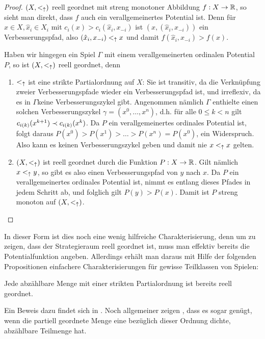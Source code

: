 \begin{proof}
	$(X, <_\uparrow)$ reell geordnet mit streng monotoner Abbildung $f: X \to \mathbb{R}$, so sieht man direkt, dass $f$ auch ein verallgemeinertes Potential ist. Denn für $x \in X, \hat{x}_i \in X_i$ mit $c_i(x) > c_i(\hat{x}_i, x_{-i})$ ist $(x, (\hat{x}_i, x_{-i}))$ ein Verbesserungspfad, also $(\hat{x}_i, x_{-i}) <_\uparrow x$ und damit $f(\hat{x}_i, x_{-i}) > f(x)$.
	
	Haben wir hingegen ein Spiel $\Gamma$ mit einem verallgemeinerten ordinalen Potential $P$, so ist $(X, <_\uparrow)$ reell geordnet, denn
	\begin{enumerate}
		\item $<_\uparrow$ ist eine strikte Partialordnung auf $X$: Sie ist transitiv, da die Verknüpfung zweier Verbesserungspfade wieder ein Verbesserungspfad ist, und irreflexiv, da es in $\Gamma$keine Verbesserungszykel gibt. Angenommen nämlich $\Gamma$ enthielte einen solchen Verbesserungszykel $\gamma = (x^0, \dots, x^n)$, d.h. für alle $0 \leq k < n$ gilt $c_{i(k)}(x^{k+1}) \prec c_{i(k)}(x^k)$. Da $P$ ein verallgemeinertes ordinales Potential ist, folgt daraus $P(x^0) > P(x^1) > \dots > P(x^n) = P(x^0)$, ein Widerspruch. Also kann es keinen Verbesserungszykel geben und damit nie $x <_\uparrow x$ gelten.
		\item $(X, <_\uparrow)$ ist reell geordnet durch die Funktion $P: X \to \mathbb{R}$. Gilt nämlich $x <_\uparrow y$, so gibt es also einen Verbesserungspfad von $y$ nach $x$. Da $P$ ein verallgemeinertes ordinales Potential ist, nimmt es entlang dieses Pfades in jedem Schritt ab, und folglich gilt $P(y) > P(x)$. Damit ist $P$ streng monoton auf $(X, <_\uparrow)$. \qedhere
	\end{enumerate} 
\end{proof}

In dieser Form ist dies noch eine wenig hilfreiche Charakterisierung, denn um zu zeigen, dass der Strategieraum reell geordnet ist, muss man effektiv bereits die Potentialfunktion angeben. Allerdings erhält man daraus mit Hilfe der folgenden Propositionen einfachere Charakterisierungen für gewisse Teilklassen von Spielen:

\begin{prop}\label{prop:AbzReellGeordnet}
	Jede abzählbare Menge mit einer strikten Partialordnung ist bereits reell geordnet.
\end{prop}

Ein Beweis dazu findet sich in \cite[Lemma 2.2]{CharExOrdPot}. Noch allgemeiner zeigen \citeauthor{CharExOrdPot}, dass es sogar genügt, wenn die partiell geordnete Menge eine bezüglich dieser Ordnung dichte, abzählbare Teilmenge hat.

